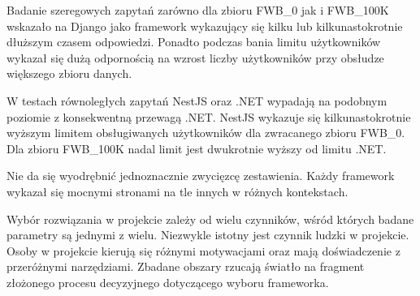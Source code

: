 Badanie szeregowych zapytań zarówno dla zbioru FWB\_0 jak i FWB\_100K wskazało na Django jako framework wykazujący się kilku lub kilkunastokrotnie dłuższym czasem odpowiedzi.
Ponadto podczas bania limitu użytkowników wykazał się dużą odpornością na wzrost liczby użytkowników przy obsłudze większego zbioru danych.

W testach równoległych zapytań NestJS oraz .NET wypadają na podobnym poziomie z konsekwentną przewagą .NET.
NestJS wykazuje się kilkunastokrotnie wyższym limitem obsługiwanych użytkowników dla zwracanego zbioru FWB\_0.
Dla zbioru FWB\_100K nadal limit jest dwukrotnie wyższy od limitu .NET.

Nie da się wyodrębnić jednoznacznie zwycięzcę zestawienia.
Każdy framework wykazał się mocnymi stronami na tle innych w różnych kontekstach.

Wybór rozwiązania w projekcie zależy od wielu czynników, wśród których badane parametry są jednymi z wielu.
Niezwykle istotny jest czynnik ludzki w projekcie.
Osoby w projekcie kierują się różnymi motywacjami oraz mają doświadczenie z przeróżnymi narzędziami.
Zbadane obszary rzucają światło na fragment złożonego procesu decyzyjnego dotyczącego wyboru frameworka.